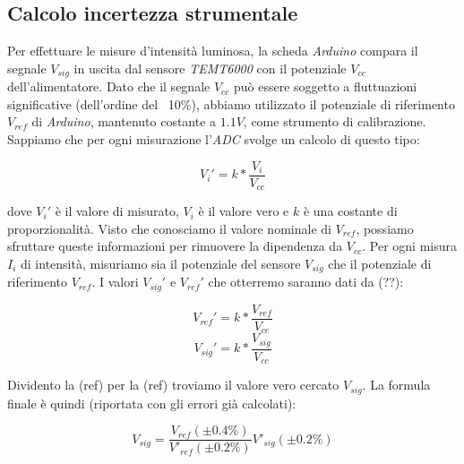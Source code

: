 \subsection{Calcolo incertezza strumentale}\label{subsec:calcolo-incertezza-strumentale}
  Per effettuare le misure d'intensità luminosa, la scheda \emph{Arduino} compara
  il segnale $V_{sig}$ in uscita dal sensore \emph{TEMT6000} con il potenziale
  $V_{cc}$ dell'alimentatore.
  Dato che il segnale $V_{cc}$ può essere soggetto a fluttuazioni significative %
  (dell'ordine del ~10\%), abbiamo utilizzato il potenziale di riferimento
  $V_{ref}$ di \emph{Arduino}, mantenuto costante a $1.1V$, come strumento di
  calibrazione.
  Sappiamo che per ogni misurazione l'\emph{ADC} svolge un calcolo di questo tipo:

  \begin{equation}
    V_i' = k * \frac {V_i} {V_{cc}}
  \end{equation}

  \noindent dove $V_i'$ è il valore di misurato, $V_i$ è il valore vero e $k$
  è una costante di proporzionalità. Visto che conosciamo il valore nominale
  di $V_{ref}$, possiamo sfruttare queste informazioni per rimuovere la
  dipendenza da $V_{cc}$. Per ogni misura $I_i$ di intensità, misuriamo sia
  il potenziale del sensore $V_{sig}$ che il potenziale di riferimento $V_{ref}$.
  I valori $V_{sig}'$ e $V_{ref}'$ che otterremo saranno dati da (??): %

  \vspace{-10mm}
  \begin{multicols}{2}
    \begin{equation}
      V_{ref}' = k * \frac {V_{ref}} {V_{cc}}
    \end{equation}
  \break
    \begin{equation}
      V_{sig}' = k * \frac {V_{sig}} {V_{cc}}
    \end{equation}
  \end{multicols}

  \noindent Dividento la (ref) per la (ref) troviamo il valore vero cercato $V_{sig}$.%
  La formula finale è quindi (riportata con gli errori già calcolati):

  \begin{equation}
    V_{sig} = \frac {
      V_{ref} (\pm 0.4\%)
    } {
      V'_{ref} (\pm 0.2\%)
    } V'_{sig} (\pm 0.2\%)
    \label{eq:misura-intensità}
  \end{equation}

